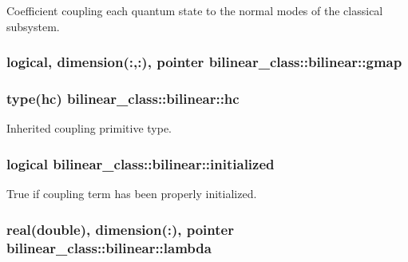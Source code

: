 Coefficient coupling each quantum state to the normal modes of the classical subsystem. 

\hypertarget{structbilinear__class_1_1bilinear_aeb06e78f97c5cdac0c83422ec087e2e0}{
\subsubsection[{gmap}]{\setlength{\rightskip}{0pt plus 5cm}logical, dimension(\+:,\+:), pointer bilinear\+\_\+class\+::bilinear\+::gmap\hspace{0.3cm}{\ttfamily [private]}}}\label{structbilinear__class_1_1bilinear_aeb06e78f97c5cdac0c83422ec087e2e0}
\hypertarget{structbilinear__class_1_1bilinear_aeb9f98e320b690f4bfef83caf407dfaa}{
\subsubsection[{hc}]{\setlength{\rightskip}{0pt plus 5cm}type(hc) bilinear\+\_\+class\+::bilinear\+::hc\hspace{0.3cm}{\ttfamily [private]}}}\label{structbilinear__class_1_1bilinear_aeb9f98e320b690f4bfef83caf407dfaa}


Inherited coupling primitive type. 

\hypertarget{structbilinear__class_1_1bilinear_a97bca767cbc1ecae9489db5950da06bc}{
\subsubsection[{initialized}]{\setlength{\rightskip}{0pt plus 5cm}logical bilinear\+\_\+class\+::bilinear\+::initialized\hspace{0.3cm}{\ttfamily [private]}}}\label{structbilinear__class_1_1bilinear_a97bca767cbc1ecae9489db5950da06bc}


True if coupling term has been properly initialized. 

\hypertarget{structbilinear__class_1_1bilinear_aabd615d49d52220aac52707b2e2b1aa6}{
\subsubsection[{lambda}]{\setlength{\rightskip}{0pt plus 5cm}real(double), dimension(\+:), pointer bilinear\+\_\+class\+::bilinear\+::lambda\hspace{0.3cm}{\ttfamily [private]}}}\label{structbilinear__class_1_1bilinear_aabd615d49d52220aac52707b2e2b1aa6}


